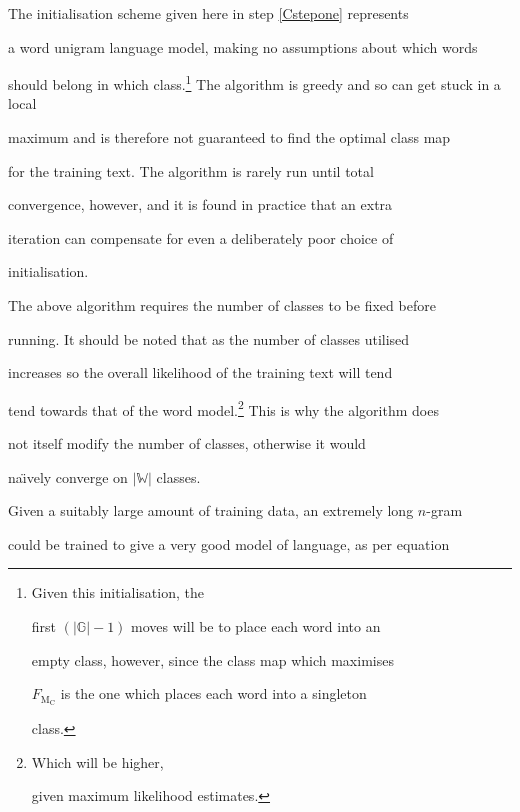 The initialisation scheme given here in step \ref{Cstepone} represents


a word unigram language model, making no assumptions about which words


should belong in which class.\footnote{Given this initialisation, the


first $(|\mathbb{G}|-1)$ moves will be to place each word into an


empty class, however, since the class map which maximises


$F_{\mathrm{M}_\mathrm{C}}$ is the one which places each word into a singleton


class.}  The algorithm is greedy and so can get stuck in a local


maximum and is therefore not guaranteed to find the optimal class map


for the training text.  The algorithm is rarely run until total


convergence, however, and it is found in practice that an extra


iteration can compensate for even a deliberately poor choice of


initialisation.





The above algorithm requires the number of classes to be fixed before


running. It should be noted that as the number of classes utilised


increases so the overall likelihood of the training text will tend


tend towards that of the word model.\footnote{Which will be higher,


given maximum likelihood estimates.}  This is why the algorithm does


not itself modify the number of classes, otherwise it would


na\"{\i}vely converge on $|\mathbb{W}|$ classes.











\label{robust_estimation}


Given a suitably large amount of training data, an extremely long $n$-gram


could be trained to give a very good model of language, as per equation


